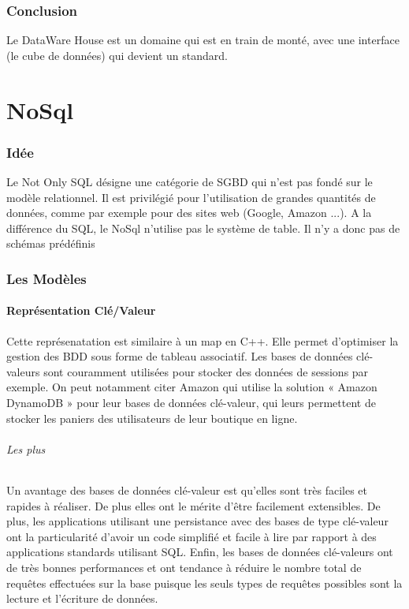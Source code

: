 \documentclass[a4paper,11pt]{article}
\begin{document}
		\section{Conclusion}
		
		Le DataWare House est un domaine qui est en train de monté, avec une interface (le cube de données) qui devient un standard.
				
\part{NoSql}
	\section{Idée}			
		Le \og{}Not Only SQL\fg{} désigne une catégorie de \textsc{SGBD} qui n'est pas fondé sur le modèle relationnel. Il est privilégié pour l'utilisation de grandes quantités de données, comme par exemple pour des sites web (Google, Amazon ...). A la différence du SQL, le NoSql n'utilise pas le système de table. Il n'y a donc pas de schémas prédéfinis
	~\\

	\section{Les Modèles}
		\subsection{Représentation Clé/Valeur}
		Cette représenatation est similaire à un \og{}map\fg{} en C++. Elle permet d'optimiser la gestion des BDD sous forme de tableau associatif. Les bases de données clé-valeurs sont couramment utilisées pour stocker des données de sessions par exemple. On peut notamment citer Amazon qui utilise la solution « Amazon DynamoDB » pour leur bases de données clé-valeur, qui leurs permettent de stocker les paniers des utilisateurs de leur boutique en ligne.
		
		\paragraph{Les plus}

		Un avantage des bases de données clé-valeur est qu'elles sont très faciles et rapides à réaliser. De plus elles ont le mérite d’être facilement extensibles.	De plus, les applications utilisant une persistance avec des bases de type clé-valeur ont la particularité d'avoir un code simplifié et facile à lire par rapport à des applications standards utilisant SQL. Enfin, les bases de données clé-valeurs ont de très bonnes performances et ont tendance à réduire le nombre total de requêtes effectuées sur la base puisque les seuls types de requêtes possibles sont la 
lecture et l'écriture de données.
		
\end{document}
